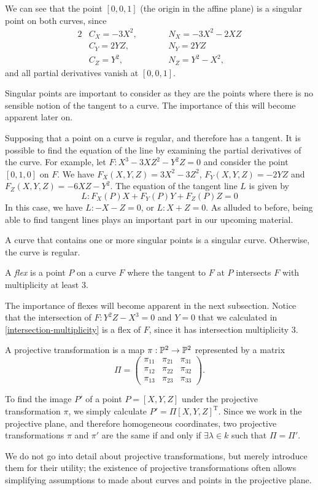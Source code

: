 We can see that the point $[0,0,1]$ (the origin in the affine plane) is a singular point on both curves, since
\begin{alignat*}{2}
	&C_X = -3X^2,\qquad &&N_X = - 3X^2 - 2XZ\\
	&C_Y = 2YZ,\qquad &&N_Y = 2YZ\\
	&C_Z = Y^2,\qquad &&N_Z = Y^2 -X^2,
\end{alignat*}
and all partial derivatives vanish at $[0,0,1]$.

Singular points are important to consider as they are the points where there is no sensible notion of the tangent to a curve.
The importance of this will become apparent later on.

Supposing that a point on a curve is regular, and therefore has a tangent.
It is possible to find the equation of the line by examining the partial derivatives of the curve.
For example, let $F: X^3 - 3XZ^2 - Y^2Z = 0$ and consider the point $[0,1,0]$ on $F$.
We have $F_X(X,Y,Z) = 3X^2 -3Z^2$, $F_Y(X,Y,Z) = -2YZ$ and $F_Z(X,Y,Z) = -6XZ - Y^2$.
The equation of the tangent line $L$ is given by
$$L : F_X(P)X + F_Y(P)Y + F_Z(P)Z = 0$$
In this case, we have $L : -X - Z = 0$, or $L: X + Z = 0$.
As alluded to before, being able to find tangent lines plays an important part in our upcoming material.

\begin{definition}
	A curve that contains one or more singular points is a singular curve.
	Otherwise, the curve is regular.
\end{definition}

\begin{definition}
	A \emph{flex} is a point $P$ on a curve $F$ where the tangent to $F$ at $P$ intersects $F$ with multiplicity at least 3.
\end{definition}

The importance of flexes will become apparent in the next subsection.
Notice that the intersection of $F : Y^2Z - X^3 = 0$ and $Y=0$ that we calculated in \cref{intersection-multiplicity} is a flex of $F$, since it has intersection multiplicity 3.
\begin{definition}
	A projective transformation is a map $\pi : \pn[2] \rightarrow \pn[2]$ represented by a matrix
	$$\Pi = \left(
		\begin{matrix}
			\pi_{11} & \pi_{21} & \pi_{31}\\
			\pi_{12} & \pi_{22} & \pi_{32}\\
			\pi_{13} & \pi_{23} & \pi_{33}
		\end{matrix}
	\right).
	$$
\end{definition}
To find the image $P'$ of a point $P = [X,Y,Z]$ under the projective transformation $\pi$, we simply calculate $P' = \Pi [X,Y,Z]^{\mathrm{T}}$.
Since we work in the projective plane, and therefore homogeneous coordinates, two projective transformations $\pi$ and $\pi'$ are the same if and only if $\exists\lambda\in k$ such that $\Pi = \Pi'$.

We do not go into detail about projective transformations, but merely introduce them for their utility; the existence of projective transformations often allows simplifying assumptions to made about curves and points in the projective plane.
